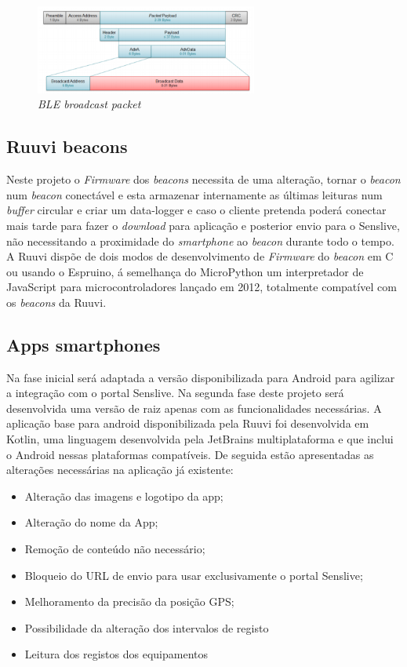 \begin{figure}[htb]
\centering
\includegraphics[width=0.65\textwidth]{images/blepacket.png}
\caption{\textit{BLE broadcast packet}\cite{blepacket}}\label{blepacket}
\end{figure}


\subsection{Ruuvi beacons}
\par Neste projeto o \textit{Firmware} dos  \textit{beacons} necessita de uma alteração, tornar o  \textit{beacon} num \textit{beacon} conectável e esta armazenar internamente as últimas leituras num \textit{buffer} circular e criar um data-logger e caso o cliente pretenda poderá conectar mais tarde para fazer o \textit{download} para aplicação e posterior envio para o Senslive, não necessitando a proximidade do \textit{smartphone} ao \textit{beacon} durante todo o tempo. A Ruuvi dispõe de dois modos de desenvolvimento de \textit{Firmware} do \textit{beacon} em C ou usando o Espruino, á semelhança do MicroPython um interpretador de JavaScript para microcontroladores lançado em 2012, totalmente compatível com os \textit{beacons} da Ruuvi.

\subsection{Apps smartphones}
Na fase inicial será adaptada a versão disponibilizada para Android para agilizar a integração com o portal Senslive. Na segunda fase deste projeto será desenvolvida uma versão de raiz apenas com as funcionalidades necessárias. A aplicação base para android disponibilizada pela Ruuvi foi desenvolvida em Kotlin\cite{ruuviappgithub}, uma linguagem desenvolvida pela JetBrains multiplataforma e que inclui o Android nessas plataformas compatíveis.
De seguida estão apresentadas as alterações necessárias na aplicação já existente:
\begin{itemize}
\item Alteração das imagens e logotipo da app;
\item Alteração do nome da App;
\item Remoção de conteúdo não necessário;
\item Bloqueio do URL de envio para usar exclusivamente o portal Senslive;
\item Melhoramento da precisão da posição GPS;
\item Possibilidade da alteração dos intervalos de registo
\item Leitura dos registos dos equipamentos
\end{itemize}



